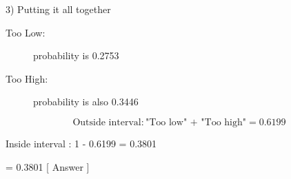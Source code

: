 3)	Putting it all together

\begin{description}    
	\item[Too Low:] probability is 0.2753
	\item[Too High:] probability is also 0.3446
\end{description}

\[    \mbox{Outside interval} : \mbox{"Too low" + "Too high"} = 0.6199\]

Inside interval : 1 - 0.6199 = 0.3801



= 0.3801     [    Answer    ] 





	
